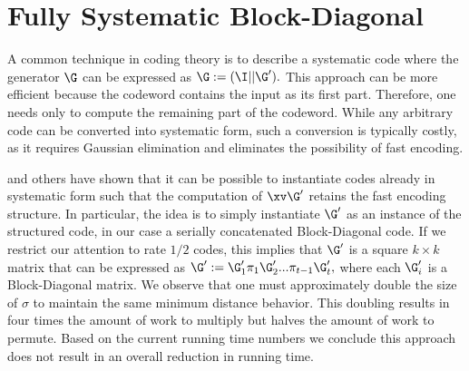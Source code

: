 
\section{Fully Systematic Block-Diagonal}
A common technique in coding theory is to describe a systematic code where the generator $\G$ can be expressed as 
$
    \G := (\I || \G').
$
This approach can be more efficient because the codeword contains the input as its first part. Therefore, one needs only to compute the remaining part of the codeword. 
While any arbitrary code can be converted into systematic form, such a conversion is typically costly, as it requires Gaussian elimination and eliminates the possibility of fast encoding.

\cite{EC} and others have shown that it can be possible to instantiate codes already in systematic form such that the computation of $\xv\G'$ retains the fast encoding structure. In particular, the idea is to simply instantiate $\G'$ as an instance of the structured code, in our case a serially concatenated Block-Diagonal code. If we restrict our attention to rate $1/2$ codes, this implies that $\G'$ is a square $k\times k$ matrix that can be expressed as
$
\G':=\G'_1\pi_1\G'_2 ... \pi_{t-1}\G'_t,
$
where each $\G'_i$ is a Block-Diagonal matrix. We observe that one must approximately double the size of $\sigma$ to maintain the same minimum distance behavior. This doubling results in four times the amount of work to multiply but halves the amount of work to permute. Based on the current running time numbers we conclude this approach does not result in an overall reduction in running time. 